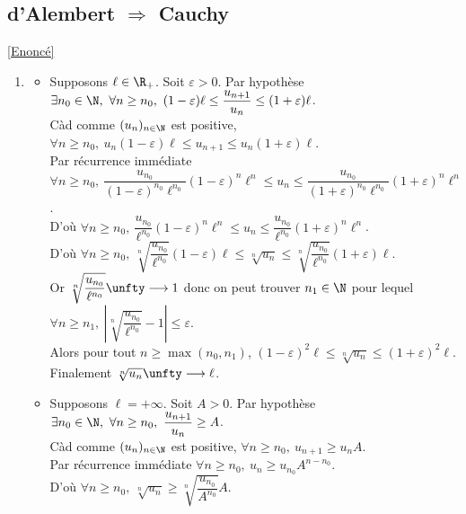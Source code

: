 \documentclass{book}
\begin{document}
	\subsection{d'Alembert $\Rightarrow$ Cauchy }
	\label{sec:dalembert-rightarrow-cauchy}
	\textcolor{blue}{\hyperref[d'Alembert implique Cauchy]{[Enoncé]}}\\
	\begin{enumerate}[leftmargin=*]
		\item \begin{itemize}
			\item Supposons $\ell\in \R_+$. Soit $\varepsilon>0$. Par hypothèse $\exists n_0\in \N,\ \forall n\geq n_0,\ (1-\varepsilon)\ell\leq\dfrac{u_{n+1}}{u_n}\leq (1+\varepsilon)\ell$.\\
			Càd comme $(u_n)_{n\in \N}$ est positive, $\forall n\geq n_0,\ u_n(1-\varepsilon)\ell\leq u_{n+1}\leq u_n(1+\varepsilon)\ell$.\\
			Par récurrence immédiate $\forall n\geq n_0,\ \dfrac{u_{n_0}}{(1-\varepsilon)^{n_0}\ell^{n_0}}(1-\varepsilon)^n\ell^n\leq u_n\leq \dfrac{u_{n_0}}{(1+\varepsilon)^{n_0}\ell^{n_0}}(1+\varepsilon)^n\ell^n$.\\
			D'où $\forall n\geq n_0,\ \dfrac{u_{n_0}}{\ell^{n_0}}(1-\varepsilon)^n\ell^n\leq u_n\leq \dfrac{u_{n_0}}{\ell^{n_0}}(1+\varepsilon)^n\ell^n$.\\
			D'où $\forall n\geq n_0,\ \sqrt[n]{\dfrac{u_{n_0}}{\ell^{n_0}}}(1-\varepsilon)\ell\leq \sqrt[n]{u_n}\leq \sqrt[n]{\dfrac{u_{n_0}}{\ell^{n_0}}}(1+\varepsilon)\ell$.\\
			Or $\sqrt[n]{\dfrac{u_{n_0}}{\ell^{n_0}}}\unfty\longrightarrow 1$ donc on peut trouver $n_1\in \N$ pour lequel $\forall n\geq n_1,\ \left|\sqrt[n]{\dfrac{u_{n_0}}{\ell^{n_0}}}-1\right|\leq \varepsilon$.\\
			Alors pour tout $n\geq \max(n_0,n_1)$, $(1-\varepsilon)^2\ell\leq \sqrt[n]{u_n}\leq (1+\varepsilon)^2\ell$.\\
			Finalement $\sqrt[n]{u_n}\unfty\longrightarrow\ell$.
			\item Supposons $\ell=+\infty$. Soit $A>0$. Par hypothèse $\exists n_0\in \N,\ \forall n\geq n_0,\ \dfrac{u_{n+1}}{u_n}\geq A$.\\
			Càd comme $(u_n)_{n\in \N}$ est positive, $\forall n\geq n_0,\ u_{n+1}\geq u_nA$.\\
			Par récurrence immédiate $\forall n\geq n_0,\ u_n\geq u_{n_0}A^{n-n_0}$.\\
			D'où $\forall n\geq n_0,\ \sqrt[n]{u_n}\geq \sqrt[n]{\dfrac{u_{n_0}}{A^{n_0}}}A$.\\

\end{itemize}
\end{enumerate}
\end{document}
